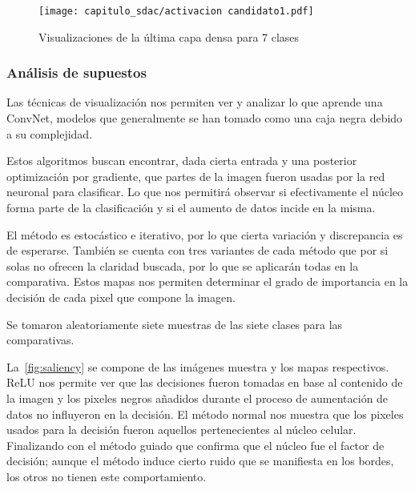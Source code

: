 \begin{figure}[H]
    \centering
    \texttt{[image: capitulo\_sdac/activacion candidato1.pdf]}
    \caption{Visualizaciones de la última capa densa para 7 clases}\label{fig:densa}
\end{figure}

\subsubsection{Análisis de supuestos}

Las técnicas de visualización nos permiten ver y analizar lo que aprende una
ConvNet, modelos que generalmente se han tomado como una caja negra debido a su
complejidad.

Estos algoritmos buscan encontrar, dada cierta entrada y una posterior
optimización por gradiente, que partes de la imagen fueron usadas por la red
neuronal para clasificar. Lo que nos permitirá observar si efectivamente el
núcleo forma parte de la clasificación y si el aumento de datos incide en la
misma.

El método es estocástico e iterativo, por lo que cierta variación y discrepancia
es de esperarse. También se cuenta con tres variantes de cada método que por si
solas no ofrecen la claridad buscada, por lo que se aplicarán todas en la
comparativa. Estos mapas nos permiten determinar el grado de importancia en la
decisión de cada pixel que compone la imagen.

Se tomaron aleatoriamente siete muestras de las siete clases para las
comparativas.

La~\autoref{fig:saliency} se compone de las imágenes muestra y los mapas
respectivos. ReLU nos permite ver que las decisiones fueron tomadas en base al
contenido de la imagen y los pixeles negros añadidos durante el proceso de
aumentación de datos no influyeron en la decisión. El método normal nos muestra
que los pixeles usados para la decisión fueron aquellos pertenecientes al núcleo
celular. Finalizando con el método guiado que confirma que el núcleo fue el
factor de decisión; aunque el método induce cierto ruido que se manifiesta en
los bordes, los otros no tienen este comportamiento.

